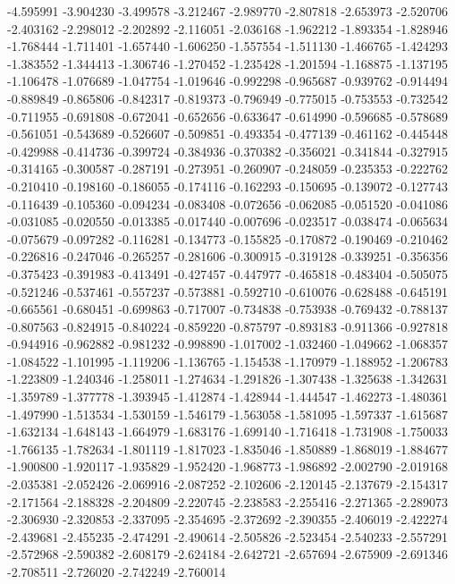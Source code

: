 -4.595991
-3.904230
-3.499578
-3.212467
-2.989770
-2.807818
-2.653973
-2.520706
-2.403162
-2.298012
-2.202892
-2.116051
-2.036168
-1.962212
-1.893354
-1.828946
-1.768444
-1.711401
-1.657440
-1.606250
-1.557554
-1.511130
-1.466765
-1.424293
-1.383552
-1.344413
-1.306746
-1.270452
-1.235428
-1.201594
-1.168875
-1.137195
-1.106478
-1.076689
-1.047754
-1.019646
-0.992298
-0.965687
-0.939762
-0.914494
-0.889849
-0.865806
-0.842317
-0.819373
-0.796949
-0.775015
-0.753553
-0.732542
-0.711955
-0.691808
-0.672041
-0.652656
-0.633647
-0.614990
-0.596685
-0.578689
-0.561051
-0.543689
-0.526607
-0.509851
-0.493354
-0.477139
-0.461162
-0.445448
-0.429988
-0.414736
-0.399724
-0.384936
-0.370382
-0.356021
-0.341844
-0.327915
-0.314165
-0.300587
-0.287191
-0.273951
-0.260907
-0.248059
-0.235353
-0.222762
-0.210410
-0.198160
-0.186055
-0.174116
-0.162293
-0.150695
-0.139072
-0.127743
-0.116439
-0.105360
-0.094234
-0.083408
-0.072656
-0.062085
-0.051520
-0.041086
-0.031085
-0.020550
-0.013385
-0.017440
-0.007696
-0.023517
-0.038474
-0.065634
-0.075679
-0.097282
-0.116281
-0.134773
-0.155825
-0.170872
-0.190469
-0.210462
-0.226816
-0.247046
-0.265257
-0.281606
-0.300915
-0.319128
-0.339251
-0.356356
-0.375423
-0.391983
-0.413491
-0.427457
-0.447977
-0.465818
-0.483404
-0.505075
-0.521246
-0.537461
-0.557237
-0.573881
-0.592710
-0.610076
-0.628488
-0.645191
-0.665561
-0.680451
-0.699863
-0.717007
-0.734838
-0.753938
-0.769432
-0.788137
-0.807563
-0.824915
-0.840224
-0.859220
-0.875797
-0.893183
-0.911366
-0.927818
-0.944916
-0.962882
-0.981232
-0.998890
-1.017002
-1.032460
-1.049662
-1.068357
-1.084522
-1.101995
-1.119206
-1.136765
-1.154538
-1.170979
-1.188952
-1.206783
-1.223809
-1.240346
-1.258011
-1.274634
-1.291826
-1.307438
-1.325638
-1.342631
-1.359789
-1.377778
-1.393945
-1.412874
-1.428944
-1.444547
-1.462273
-1.480361
-1.497990
-1.513534
-1.530159
-1.546179
-1.563058
-1.581095
-1.597337
-1.615687
-1.632134
-1.648143
-1.664979
-1.683176
-1.699140
-1.716418
-1.731908
-1.750033
-1.766135
-1.782634
-1.801119
-1.817023
-1.835046
-1.850889
-1.868019
-1.884677
-1.900800
-1.920117
-1.935829
-1.952420
-1.968773
-1.986892
-2.002790
-2.019168
-2.035381
-2.052426
-2.069916
-2.087252
-2.102606
-2.120145
-2.137679
-2.154317
-2.171564
-2.188328
-2.204809
-2.220745
-2.238583
-2.255416
-2.271365
-2.289073
-2.306930
-2.320853
-2.337095
-2.354695
-2.372692
-2.390355
-2.406019
-2.422274
-2.439681
-2.455235
-2.474291
-2.490614
-2.505826
-2.523454
-2.540233
-2.557291
-2.572968
-2.590382
-2.608179
-2.624184
-2.642721
-2.657694
-2.675909
-2.691346
-2.708511
-2.726020
-2.742249
-2.760014
